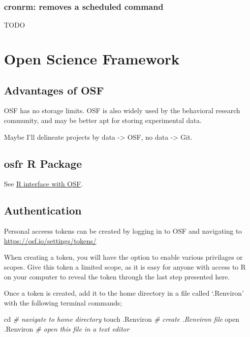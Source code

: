\documentclass[]{article}
\newenvironment{Shaded}{\begin{snugshade}}{\end{snugshade}}
\newcommand{\CommentTok}[1]{\textcolor[rgb]{0.56,0.35,0.01}{\textit{#1}}}
\newcommand{\FunctionTok}[1]{\textcolor[rgb]{0.00,0.00,0.00}{#1}}
\newcommand{\BuiltInTok}[1]{#1}
\newcommand{\ExtensionTok}[1]{#1}
\newcommand{\NormalTok}[1]{#1}
\begin{document}
\subsubsection{cronrm: removes a scheduled command}

\begin{Shaded}
\begin{Highlighting}[]

\ExtensionTok{TODO}
\end{Highlighting}
\end{Shaded}

\section{Open Science Framework}

\subsection{Advantages of OSF}

OSF has no storage limits. OSF is also widely used by the behavioral
research community, and may be better apt for storing experimental data.

Maybe I'll delineate projects by data -\textgreater{} OSF, no data
-\textgreater{} Git.

\subsection{osfr R Package}

See
\href{https://centerforopenscience.github.io/osfr/}{\color{blue}R interface with OSF}.

\subsection{Authentication}

Personal acceess tokens can be created by logging in to OSF and
navigating to
\href{https://osf.io/settings/tokens/}{\color{blue}https://osf.io/settings/tokens/}

When creating a token, you will have the option to enable various
privilages or scopes. Give this token a limited scope, as it is easy for
anyone with access to R on your computer to reveal the token through the
last step presented here.

Once a token is created, add it to the home directory in a file called
`.Renviron' with the following terminal commands;

\begin{Shaded}
\begin{Highlighting}[]
\BuiltInTok{cd} \CommentTok{# navigate to home directory}
\FunctionTok{touch}\NormalTok{ .Renviron }\CommentTok{# create .Renviron file}
\ExtensionTok{open}\NormalTok{ .Renviron }\CommentTok{# open this file in a text editor}
\end{Highlighting}
\end{Shaded}
\end{document}
